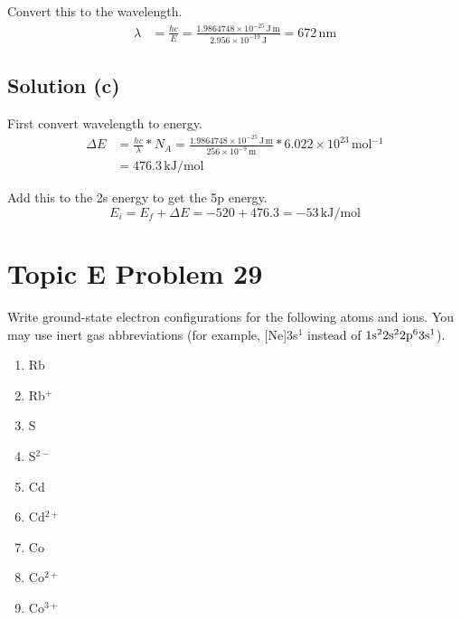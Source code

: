 \documentclass[10pt]{article}
\newcommand{\E}[1]{\times 10^{#1}}
\newcommand{\hc}{1.9864748\E{-25}\,\unit{\joule\,\meter}}
\begin{document}
            Convert this to the wavelength.
            \begin{align}
                \lambda &=  \frac{hc}{E}
                    =   \frac{\hc}{2.956\E{-19}\,\unit{\joule}}
                    =   \boxed{672\,\unit{\nano\meter}}
            \end{align}

        \subsection{Solution (c)}
            First convert wavelength to energy.
            \begin{align}
                \Delta E    &=  \frac{hc}{\lambda} * N_A
                    =   \frac{\hc}{256\E{-9}\,\unit{\meter}} * 6.022\E{23}\,\unit{\mole^{-1}}\\
                    &=  476.3\,\unit{\kilo\joule/\mole}
            \end{align}

            Add this to the 2s energy to get the 5p energy.
            \begin{equation}
                E_i =   E_f + \Delta E
                    =   -520 + 476.3
                    =   \boxed{-53\,\unit{\kilo\joule/\mole}}
            \end{equation}

    \pagebreak
    \section{Topic E Problem 29}
        Write ground-state electron configurations for the following atoms and ions. 
        You may use inert gas abbreviations (for example, [Ne]3s$^1$ instead of $\rm 1s^2 2s^2 2p^6 3s^1$).
        \begin{multicols}{3}
            \begin{enumerate}[label=\alph*)]
                \item   Rb
                \item   Rb$^+$
                \item   S
                \item   S$^{2-}$
                \item   Cd
                \item   Cd$^{2+}$
                \item   Co
                \item   Co$^{2+}$
                \item   Co$^{3+}$
            \end{enumerate}
        \end{multicols}
\end{document}
